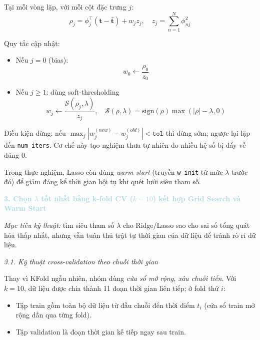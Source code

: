 Tại mỗi vòng lặp, với mỗi cột đặc trưng $j$:
\begin{equation}
\rho_j = \phi_j^{\top}(\mathbf{t}-\hat{\mathbf{t}}) + w_j z_j,
\quad z_j = \sum_{n=1}^{N}\phi_{nj}^2
\end{equation}

Quy tắc cập nhật:
\begin{itemize} [labelsep=10pt, leftmargin=2cm]
    \item Nếu $j=0$ (bias):
    \begin{equation}
    w_0 \leftarrow \frac{\rho_0}{z_0}
    \end{equation}
    \item Nếu $j\geq 1$: dùng soft-thresholding
    \begin{equation}
    w_j \leftarrow \frac{\mathcal{S}(\rho_j,\lambda)}{z_j},
    \quad
    \mathcal{S}(\rho,\lambda)=\mathrm{sign}(\rho)\max(|\rho|-\lambda,0)
    \end{equation}
\end{itemize}

Điều kiện dừng: nếu $\max_j |w_j^{(new)}-w_j^{(old)}|<\texttt{tol}$ thì dừng sớm; ngược lại lặp
đến \texttt{num\_iters}. Cơ chế này tạo nghiệm thưa tự nhiên do nhiều hệ số bị đẩy về đúng 0.

Trong thực nghiệm, Lasso còn dùng \textit{warm start} (truyền \texttt{w\_init} từ mức
$\lambda$ trước đó) để giảm đáng kể thời gian hội tụ khi quét lưới siêu tham số.

\noindent\textcolor{lightblue}{\textbf{3. Chọn $\lambda$ tốt nhất bằng k-fold CV ($k=10$) kết hợp Grid Search và Warm Start}}

\textit{Mục tiêu kỹ thuật:} tìm siêu tham số $\lambda$ cho Ridge/Lasso sao cho sai số tổng quát hóa thấp nhất,
nhưng vẫn tuân thủ trật tự thời gian của dữ liệu để tránh rò rỉ dữ liệu.

\noindent\textcolor{infocolor}{\textit{3.1. Kỹ thuật cross-validation theo chuỗi thời gian}}

Thay vì KFold ngẫu nhiên, nhóm dùng \textit{cửa sổ mở rộng, xâu chuỗi tiến}.
Với $k=10$, dữ liệu được chia thành 11 đoạn thời gian liên tiếp; ở fold thứ $i$:
\begin{itemize} [labelsep=10pt, leftmargin=2cm]
    \item Tập train gồm toàn bộ dữ liệu từ đầu chuỗi đến thời điểm $t_i$ (cửa sổ train mở rộng dần qua từng fold).
    \item Tập validation là đoạn thời gian kế tiếp ngay sau train.
\end{itemize}

